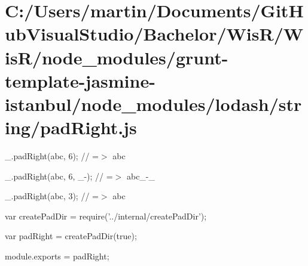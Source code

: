 \hypertarget{_c_1_2_users_2martin_2_documents_2_git_hub_visual_studio_2_bachelor_2_wis_r_2_wis_r_2node_modulefb0dbb43dccce002cc574378b64c2280}{}\section{C\+:/\+Users/martin/\+Documents/\+Git\+Hub\+Visual\+Studio/\+Bachelor/\+Wis\+R/\+Wis\+R/node\+\_\+modules/grunt-\/template-\/jasmine-\/istanbul/node\+\_\+modules/lodash/string/pad\+Right.\+js}
\+\_\+.\+pad\+Right(\textquotesingle{}abc\textquotesingle{}, 6); // =$>$ \textquotesingle{}abc \textquotesingle{}

\+\_\+.\+pad\+Right(\textquotesingle{}abc\textquotesingle{}, 6, \textquotesingle{}\+\_\+-\/\textquotesingle{}); // =$>$ \textquotesingle{}abc\+\_\+-\/\+\_\+\textquotesingle{}

\+\_\+.\+pad\+Right(\textquotesingle{}abc\textquotesingle{}, 3); // =$>$ \textquotesingle{}abc\textquotesingle{}


\begin{DoxyCodeInclude}
var createPadDir = require(\textcolor{stringliteral}{'../internal/createPadDir'});

var padRight = createPadDir(\textcolor{keyword}{true});

module.exports = padRight;
\end{DoxyCodeInclude}
 